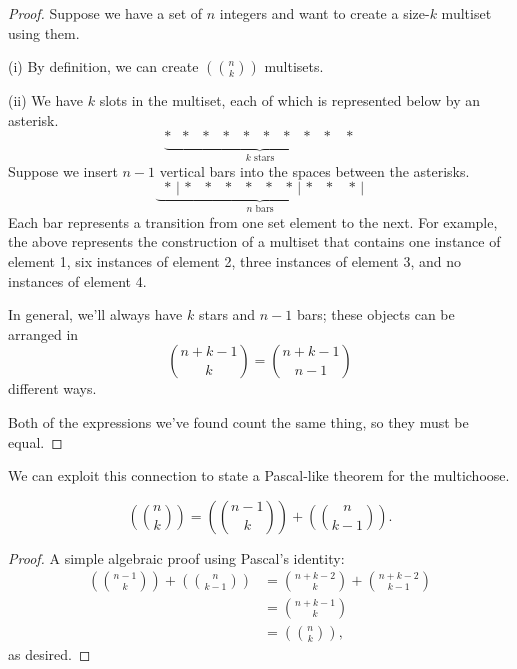 \documentclass[../m055main.tex]{subfiles}
\begin{document}
\begin{proof}
    Suppose we have a set of $n$ integers and want to create a size-$k$ multiset using them.
    \smallskip

    (i) By definition, we can create $\left( {n \choose k} \right)$ multisets.
    \smallskip

    (ii) We have $k$ slots in the multiset, each of which is represented below by an asterisk.
    \[ \underbrace{* \,\phantom{|}\, * \,\phantom{|}\, * \,\phantom{|}\, * \,\phantom{|}\, * \,\phantom{|}\, * \,\phantom{|}\, * \,\phantom{|}\, * \,\phantom{|}\, * \,\phantom{|}\,\, *}_{k \text{ stars}} \]
    Suppose we insert $n-1$ vertical bars into the spaces between the asterisks.
    \[ \underbrace{\phantom{|}\,* \,|\, * \,\phantom{|}\, * \,\phantom{|}\, * \,\phantom{|}\, * \,\phantom{|}\, * \,\phantom{|}\, * \,|\, * \,\phantom{|}\, * \,\phantom{|}\,\, *\,|}_{n \text{ bars}} \]
    Each bar represents a transition from one set element to the next.
    For example, the above represents the construction of a multiset that contains one instance of element 1, six instances of element 2, three instances of element 3, and no instances of element 4.

    In general, we'll always have $k$ stars and $n-1$ bars; these objects can be arranged in
    \[ {n+k-1 \choose k} = {n+k-1 \choose n-1} \]
    different ways.
    \smallskip

    Both of the expressions we've found count the same thing, so they must be equal.
\end{proof}

We can exploit this connection to state a Pascal-like theorem for the multichoose.

\begin{theorem}[]
    \[ \left( {n \choose k} \right) = \left( {n-1 \choose k} \right) + \left( {n \choose k-1} \right). \]
\end{theorem}

\begin{proof}
    A simple algebraic proof using Pascal's identity:
    \begin{align*}
        \left( {n-1 \choose k} \right) + \left( {n \choose k-1} \right) &= {n+k-2 \choose k} + {n+k-2 \choose k-1} \\
        &= {n+k-1 \choose k} \\
        &= \left( {n \choose k} \right),
    \end{align*}
    as desired.
\end{proof}
\end{document}
